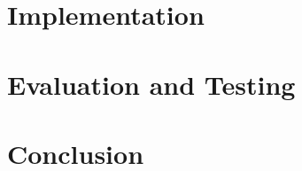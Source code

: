 
\chapter{Implementation}







\chapter{Evaluation and Testing}









\chapter{Conclusion}



% 